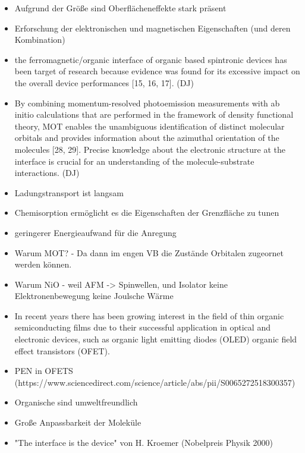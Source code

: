 \begin{itemize}
    \item Aufgrund der Größe sind Oberflächeneffekte stark präsent
    \item Erforschung der elektronischen und magnetischen Eigenschaften (und deren Kombination)
    \item the ferromagnetic/organic interface of organic based spintronic devices has been target of research because evidence was found for its excessive impact on the overall device performances [15, 16, 17]. (DJ)
    \item By combining momentum-resolved photoemission measurements with ab initio calculations that are performed in the framework of density functional theory, MOT enables the unambiguous identification of distinct molecular orbitals and provides information about the azimuthal orientation of the molecules [28, 29]. Precise knowledge about the electronic structure at the interface is crucial for an understanding of the molecule-substrate interactions. (DJ)
    \item Ladungstransport ist langsam
    \item Chemisorption ermöglicht es die Eigenschaften der Grenzfläche zu tunen
    \item geringerer Energieaufwand für die Anregung
    \item Warum MOT? - Da dann im engen VB die Zustände Orbitalen zugeornet werden können.
    \item Warum NiO - weil AFM -> Spinwellen, und Isolator keine Elektronenbewegung keine Joulsche Wärme
    \item In recent years there has been growing interest in the field of thin organic semiconducting films due to their successful application in optical and electronic devices, such as organic light emitting diodes (OLED) organic field effect transistors (OFET). \cite{Uni-Tübingen}
    \item PEN in OFETS (https://www.sciencedirect.com/science/article/abs/pii/S0065272518300357)
    \item Organische sind umweltfreundlich \cite{Schöll und Schreiber - 2018 - Chapter 24 - Thin Films of Organic Molecules Inte.pdf}
    \item Große Anpassbarkeit der Moleküle \cite{Schöll und Schreiber - 2018 - Chapter 24 - Thin Films of Organic Molecules Inte.pdf}
    \item "The interface is the device" von H. Kroemer (Nobelpreis Physik 2000)
\end{itemize}
